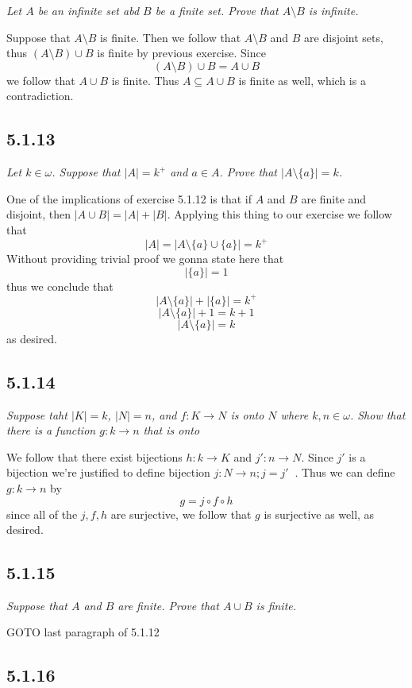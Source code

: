 \documentclass[11pt,oneside,titlepage]{book}
\DeclareMathOperator \inv {^{-1}}
\begin{document}
\textit{Let $A$ be an infinite set abd $B$ be a finite set. Prove that $A \setminus B$ is
  infinite.}

Suppose that $A \setminus B$ is finite.
Then we follow that $A \setminus B$ and $B$ are disjoint sets,
thus $(A \setminus B) \cup B$ is finite by previous exercise. Since
$$(A \setminus B) \cup B = A \cup B$$
we follow that $A \cup B$ is finite. Thus $A \subseteq A \cup B$ is finite as well, which is
a contradiction.

\subsection*{5.1.13}

\textit{Let $k \in \omega$. Suppose that $|A| = k^+$ and $a \in A$. Prove that
  $|A \setminus \{a\}| = k$.}

One of the implications of exercise 5.1.12 is that if $A$ and $B$ are finite and disjoint,
then $|A \cup B| = |A| + |B|$. Applying this thing to our exercise we follow that
$$|A| = |A \setminus \{a\} \cup \{a\}| = k^+$$
Without providing trivial proof we gonna state here that 
$$|\{a\}| = 1$$
thus we conclude that
$$|A \setminus \{a\}| + |\{a\}| = k^+$$
$$|A \setminus \{a\}| + 1 = k + 1$$
$$|A \setminus \{a\}| = k$$
as desired.

\subsection*{5.1.14}

\textit{Suppose taht $|K| = k$, $|N| = n$, and $f: K \to N$ is onto $N$ where $k, n \in \omega$.
  Show that there is a function $g: k \to n$ that is onto}

We follow that there exist bijections $h: k \to K$ and $j': n \to N$. Since $j'$ is a bijection
we're justified to define bijection $j: N \to n; j = j'\inv$. Thus we can define $g: k \to n$
by
$$g = j \circ f \circ h $$
since all of the $j, f, h$ are surjective, we follow that $g$ is surjective as well, as desired.

\subsection*{5.1.15}

\textit{Suppose that $A$ and $B$ are finite. Prove that $A \cup B$ is finite.}

GOTO last paragraph of 5.1.12

\subsection*{5.1.16}
\end{document}
